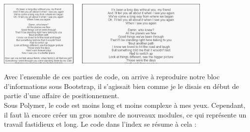 \documentclass{article}
\begin{document}
\begin{center}
\vspace{0.5cm}
\includegraphics[width=0.8\textwidth]{textes}
\vspace{0.5cm}\\
\end{center}
Avec l'ensemble de ces parties de code, on arrive \`a reproduire notre bloc d'informations sous Bootstrap, il s'agissait bien comme je le disais en d\'ebut de partie d'une affaire de positionnement.\\
Sous Polymer, le code est moins long et moins complexe \`a mes yeux. Cependant, il faut l\`a encore cr\'eer un gros nombre de nouveaux modules, ce qui repr\'esente un travail fastidieux et long. Le code dans l'index se r\'esume \`a cela :
\vspace{0.5cm}\\
\end{document}
